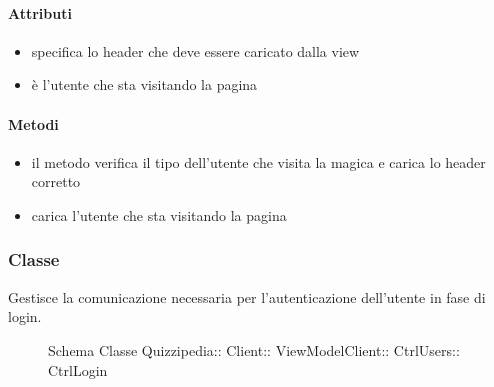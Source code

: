\paragraph{Attributi}
\begin{itemize}
\item {}
\newline
specifica lo header che deve essere caricato dalla view
\item {}
\newline
è l'utente che sta visitando la pagina
\end{itemize}
\paragraph{Metodi}
\begin{itemize}
\item {}
\newline
il metodo verifica il tipo dell'utente che visita la magica e carica lo header corretto
\newline
\item {}
\newline
carica l'utente che sta visitando la pagina
\newline
\end{itemize}
\subsubsection{Classe }
Gestisce la comunicazione necessaria per l'autenticazione dell'utente in fase di login.
\begin{figure}[H]
\centering
\noindent{}
\caption[Schema Classe CtrlLogin]{Schema Classe Quizzipedia:: Client:: ViewModelClient:: CtrlUsers:: CtrlLogin}
\end{figure}
